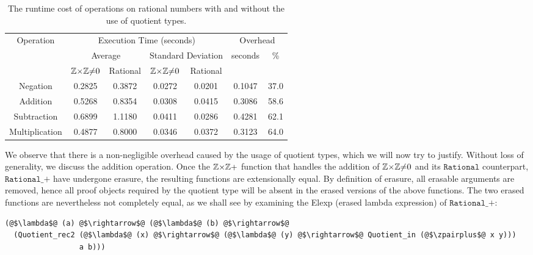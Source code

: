 \documentclass[12pt,twoside,maitrise]{dms}
\theoremstyle{definition}
\numberwithin{equation}{section}
\numberwithin{table}{chapter}
\numberwithin{figure}{chapter}
\newcommand\fn[1] {\texttt{#1}}
\begin{document}
\begin{table}[]
\centering
\begin{tabular}{@{}ccccccc@{}}
\toprule
\multirow{3}{*}{Operation} & \multicolumn{4}{c}{Execution Time (seconds)}                         & \multicolumn{2}{c}{Overhead}                   \\ \cmidrule(l){2-7}
                           & \multicolumn{2}{c}{Average} & \multicolumn{2}{c}{Standard Deviation} & \multirow{2}{*}{seconds} & \multirow{2}{*}{\%} \\
               & $\mathbb{Z}{\times}\mathbb{Z}{\ne}0$ & Rational & $\mathbb{Z}{\times}\mathbb{Z}{\ne}0$ & Rational &        &      \\ \midrule
Negation       & 0.2825   & 0.3872   & 0.0272   & 0.0201   & 0.1047 & 37.0 \\
Addition       & 0.5268   & 0.8354   & 0.0308   & 0.0415   & 0.3086 & 58.6 \\
Subtraction    & 0.6899   & 1.1180   & 0.0411   & 0.0286   & 0.4281 & 62.1 \\
Multiplication & 0.4877   & 0.8000   & 0.0346   & 0.0372   & 0.3123 & 64.0 \\ \bottomrule
\end{tabular}
\caption{The runtime cost of operations on rational numbers with and without the
  use of quotient types.}\label{tab:rational-benchmark}
\end{table}

We observe that there is a non-negligible overhead caused by the usage of
quotient types, which we will now try to justify. Without loss of generality, we
discuss the addition operation. Once the $\mathbb{Z}{\times}\mathbb{Z}+$ function that handles the
addition of $\mathbb{Z}{\times}\mathbb{Z}{\ne}0$ and its $\fn{Rational}$ counterpart, $\fn{Rational\_+}$
have undergone erasure, the resulting functions are extensionally equal. By
definition of erasure\cite{monnier2019typer}, all erasable arguments are
removed, hence all proof objects required by the quotient type will be absent in
the erased versions of the above functions. The two erased functions are
nevertheless not completely equal, as we shall see by examining the Elexp
(erased lambda expression)\cite{delaunay2017implementation} of
$\fn{Rational\_+}$:

\begin{verbatim}
(@$\lambda$@ (a) @$\rightarrow$@ (@$\lambda$@ (b) @$\rightarrow$@
  (Quotient_rec2 (@$\lambda$@ (x) @$\rightarrow$@ (@$\lambda$@ (y) @$\rightarrow$@ Quotient_in (@$\zpairplus$@ x y)))
                 a b)))
\end{verbatim}
\end{document}
